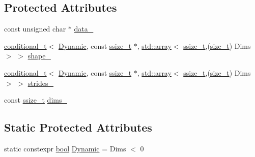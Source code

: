 \subsection*{Protected Attributes}
\begin{DoxyCompactItemize}
\item 
const unsigned char $\ast$ \mbox{\hyperlink{classunchecked__reference_a0006f51b8177e65603ef3a20c8535432}{data\+\_\+}}
\item 
\mbox{\hyperlink{detail_2common_8h_acdb0eff728aec08ed6fff07d2885ea9d}{conditional\+\_\+t}}$<$ \mbox{\hyperlink{classunchecked__reference_a4ad5525b6ab61ac1c5536df0249901b3}{Dynamic}}, const \mbox{\hyperlink{detail_2common_8h_ac430d16fc097b3bf0a7469cfd09decda}{ssize\+\_\+t}} $\ast$, \mbox{\hyperlink{_s_d_l__opengl__glext_8h_a52f38e7d822a46377fde7a02708eedb1}{std\+::array}}$<$ \mbox{\hyperlink{detail_2common_8h_ac430d16fc097b3bf0a7469cfd09decda}{ssize\+\_\+t}},(\mbox{\hyperlink{detail_2common_8h_a801d6a451a01953ef8cbae6feb6a3638}{size\+\_\+t}}) Dims $>$ $>$ \mbox{\hyperlink{classunchecked__reference_a9369fa82f1cef7ce910e906628d59e7c}{shape\+\_\+}}
\item 
\mbox{\hyperlink{detail_2common_8h_acdb0eff728aec08ed6fff07d2885ea9d}{conditional\+\_\+t}}$<$ \mbox{\hyperlink{classunchecked__reference_a4ad5525b6ab61ac1c5536df0249901b3}{Dynamic}}, const \mbox{\hyperlink{detail_2common_8h_ac430d16fc097b3bf0a7469cfd09decda}{ssize\+\_\+t}} $\ast$, \mbox{\hyperlink{_s_d_l__opengl__glext_8h_a52f38e7d822a46377fde7a02708eedb1}{std\+::array}}$<$ \mbox{\hyperlink{detail_2common_8h_ac430d16fc097b3bf0a7469cfd09decda}{ssize\+\_\+t}},(\mbox{\hyperlink{detail_2common_8h_a801d6a451a01953ef8cbae6feb6a3638}{size\+\_\+t}}) Dims $>$ $>$ \mbox{\hyperlink{classunchecked__reference_a2c0c345a2c143eda073394a8fe8f59f9}{strides\+\_\+}}
\item 
const \mbox{\hyperlink{detail_2common_8h_ac430d16fc097b3bf0a7469cfd09decda}{ssize\+\_\+t}} \mbox{\hyperlink{classunchecked__reference_a40a5d39e1640cb380429e4c678d40103}{dims\+\_\+}}
\end{DoxyCompactItemize}
\subsection*{Static Protected Attributes}
\begin{DoxyCompactItemize}
\item 
static constexpr \mbox{\hyperlink{asdl_8h_af6a258d8f3ee5206d682d799316314b1}{bool}} \mbox{\hyperlink{classunchecked__reference_a4ad5525b6ab61ac1c5536df0249901b3}{Dynamic}} = Dims $<$ 0
\end{DoxyCompactItemize}
